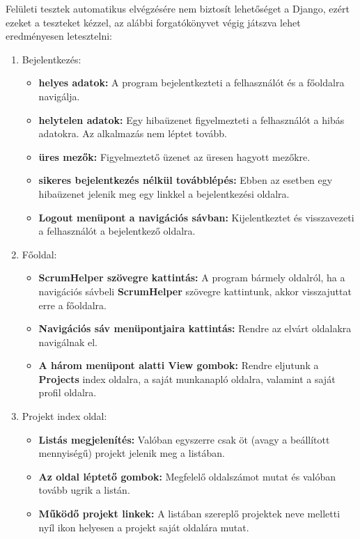 Felületi tesztek automatikus elvégzésére nem biztosít lehetőséget a Django, ezért ezeket a teszteket kézzel, az alábbi forgatókönyvet végig játszva lehet eredményesen letesztelni:

\begin{enumerate}
	\item Bejelentkezés: 
	\begin{itemize}
		\item \textbf{helyes adatok:} A program bejelentkezteti a felhasználót és a főoldalra navigálja.
		\item \textbf{helytelen adatok:} Egy hibaüzenet figyelmezteti a felhasználót a hibás adatokra. Az alkalmazás nem léptet tovább.
		\item \textbf{üres mezők:} Figyelmeztető üzenet az üresen hagyott mezőkre.
		\item \textbf{sikeres bejelentkezés nélkül továbblépés:} Ebben az esetben egy hibaüzenet jelenik meg egy linkkel a bejelentkezési oldalra.
		\item \textbf{Logout menüpont a navigációs sávban:} Kijelentkeztet és visszavezeti a felhasználót a bejelentkező oldalra.
	\end{itemize}
	\item Főoldal:
	\begin{itemize}
		\item \textbf{ScrumHelper szövegre kattintás:} A program bármely oldalról, ha a navigációs sávbeli \textbf{ScrumHelper} szövegre kattintunk, akkor visszajuttat erre a főoldalra.
		\item \textbf{Navigációs sáv menüpontjaira kattintás:} Rendre az elvárt oldalakra navigálnak el.
		\item \textbf{A három menüpont alatti View gombok:} Rendre eljutunk a \textbf{Projects} index oldalra, a saját munkanapló oldalra, valamint a saját profil oldalra.
	\end{itemize}
	\item Projekt index oldal:
	\begin{itemize}
		\item \textbf{Listás megjelenítés:} Valóban egyszerre csak öt (avagy a beállított mennyiségű) projekt jelenik meg a listában.
		\item \textbf{Az oldal léptető gombok:} Megfelelő oldalszámot mutat és valóban tovább ugrik a listán.
		\item \textbf{Működő projekt linkek:} A listában szereplő projektek neve melletti nyíl ikon helyesen a projekt saját oldalára mutat.
	\end{itemize}

\end{enumerate}
